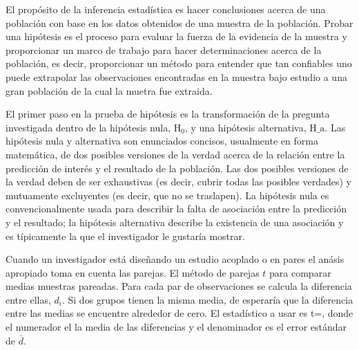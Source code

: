 El prop\'osito de la inferencia estad\'istica es hacer conclusiones
acerca de una poblaci\'on con base en los datos obtenidos de una
muestra de la poblaci\'on. Probar una hip\'otesis es el proceso para
evaluar la fuerza de la evidencia de la muestra y proporcionar un 
marco de trabajo para hacer determinaciones acerca de la poblaci\'on,
es decir, proporcionar un m\'etodo para entender que tan confiables 
uno puede extrapolar las observaciones encontradas en la muestra bajo
estudio a una gran poblaci\'on de la cual la muetra fue extraida.

El primer paso en la prueba de hip\'otesis es la transformaci\'on de
la pregunta investigada dentro de la hip\'otesis nula, $\mbox{H}_0$,
y una hip\'otesis alternativa, $\mbox{H_a}$. Las hip\'otesis nula y 
alternativa son enunciados concisos, usualmente en forma 
matem\'atica, de dos posibles versiones de la verdad acerca de la 
relaci\'on entre la predicci\'on de inter\'es y el resultado de la 
poblaci\'on. Las dos posibles versiones de la verdad deben de ser
exhaustivas (es decir, cubrir todas las posibles verdades) y 
mutuamente excluyentes (es decir, que no se traslapen). La 
hip\'otesis nula es convencionalmente usada para describir la falta 
de asociaci\'on entre la predicci\'on y el resultado; la hip\'otesis
alternativa describe la existencia de una asociaci\'on y es 
t\'ipicamente la que el investigador le gustar\'ia mostrar.

Cuando un investigador est\'a dise\~nando un estudio acoplado o en
pares el an\'asis apropiado toma en cuenta las parejas. El m\'etodo 
de parejas $t$ para comparar medias muestras pareadas. Para cada par
de observaciones se calcula la diferencia entre ellas, $d_i$. Si dos
grupos tienen la misma media, de esperar\'ia que la diferencia entre 
las medias se encuentre alrededor de cero. El estad\'istico a usar es
\be
t=,
\ee
donde el numerador el la media de las diferencias y el denominador es
el error est\'andar de $\bar d$.
